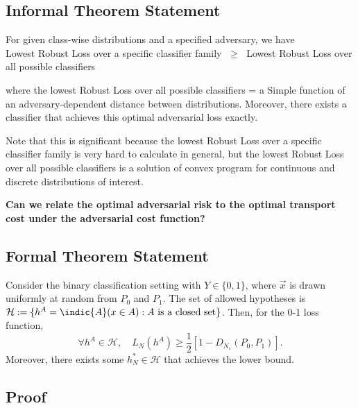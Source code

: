 \documentclass[11pt]{report}
\begin{document}
\newpage
\subsection{Informal Theorem Statement}
For given class-wise distributions and a specified adversary, we have\\

\noindent
Lowest Robust Loss over a specific classifier family \(\;\ge\;\) Lowest Robust Loss over all possible classifiers

\vspace{5pt}
\noindent
where the lowest Robust Loss over all possible classifiers = a Simple function of an adversary-dependent distance between distributions. Moreover, there exists a classifier that achieves this optimal adversarial loss exactly.

\vspace{5pt}
\noindent
Note that this is significant because the lowest Robust Loss over a specific classifier family is very hard to calculate in general, but the lowest Robust Loss over all possible classifiers is a solution of convex program for continuous and discrete distributions of interest.

\noindent
\textbf{Can we relate the optimal adversarial risk to the optimal transport cost under the adversarial cost function? \cite{bhagoji2019lower} \cite{pydi2020adversarial}}

\subsection{Formal Theorem Statement}

\begin{theorem}
Consider the binary classification setting with \( Y \in \{0,1\} \),
where \( \vec{x} \) is drawn uniformly at random from \( P_0 \) and \( P_1 \).
The set of allowed hypotheses is \(\mathcal{H} := \{ h^A = \indic{A}(x \in A) : A \text{ is a closed set} \}\). Then, for the 0-1 loss function,
\[
\forall h^A \in \mathcal{H}, \quad L_N(h^A) \ge \frac{1}{2}\left[ 1 - D_{N_\varepsilon}(P_0, P_1) \right].
\]
Moreover, there exists some \( h^*_N \in \mathcal{H} \) that achieves the lower bound.
\end{theorem}

\subsection{Proof}
\end{document}
